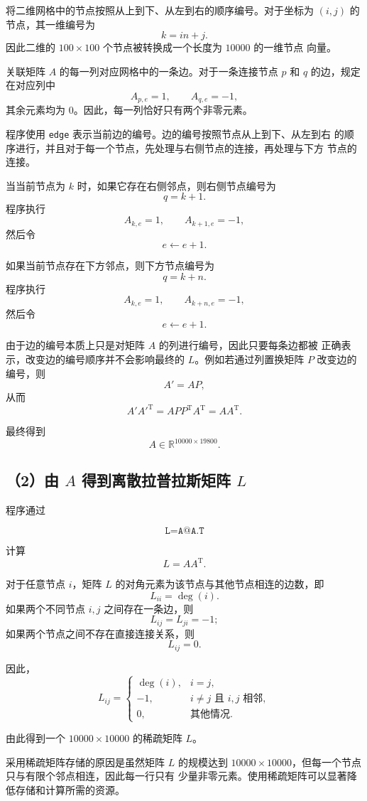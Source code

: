 \documentclass[UTF8,a4paper,11pt,fontset=fandol]{ctexart}
\begin{document}
将二维网格中的节点按照从上到下、从左到右的顺序编号。对于坐标为
$(i,j)$ 的节点，其一维编号为
\[
\boxed{k=in+j}.
\]
因此二维的 $100\times100$ 个节点被转换成一个长度为 $10000$ 的一维节点
向量。

关联矩阵 $A$ 的每一列对应网格中的一条边。对于一条连接节点 $p$ 和 $q$
的边，规定在对应列中
\[
A_{p,e}=1,\qquad A_{q,e}=-1,
\]
其余元素均为 $0$。因此，每一列恰好只有两个非零元素。

程序使用
\texttt{edge} 表示当前边的编号。边的编号按照节点从上到下、从左到右
的顺序进行，并且对于每一个节点，先处理与右侧节点的连接，再处理与下方
节点的连接。

当当前节点为 $k$ 时，如果它存在右侧邻点，则右侧节点编号为
\[
q=k+1.
\]
程序执行
\[
A_{k,e}=1,\qquad A_{k+1,e}=-1,
\]
然后令
\[
e\leftarrow e+1.
\]

如果当前节点存在下方邻点，则下方节点编号为
\[
q=k+n.
\]
程序执行
\[
A_{k,e}=1,\qquad A_{k+n,e}=-1,
\]
然后令
\[
e\leftarrow e+1.
\]

由于边的编号本质上只是对矩阵 $A$ 的列进行编号，因此只要每条边都被
正确表示，改变边的编号顺序并不会影响最终的 $L$。例如若通过列置换矩阵
$P$ 改变边的编号，则
\[
A'=AP,
\]
从而
\[
A'A'^{\mathrm T}
=APP^{\mathrm T}A^{\mathrm T}
=AA^{\mathrm T}.
\]

最终得到
\[
A\in\mathbb{R}^{10000\times19800}.
\]


\subsection*{（2）由 $A$ 得到离散拉普拉斯矩阵 $L$}

程序通过

\[
\texttt{L=A@A.T}
\]

计算
\[
\boxed{L=AA^{\mathrm T}}.
\]

对于任意节点 $i$，矩阵 $L$ 的对角元素为该节点与其他节点相连的边数，即
\[
L_{ii}=\deg(i).
\]
如果两个不同节点 $i,j$ 之间存在一条边，则
\[
L_{ij}=L_{ji}=-1;
\]
如果两个节点之间不存在直接连接关系，则
\[
L_{ij}=0.
\]

因此，
\[
L_{ij}=
\begin{cases}
\deg(i),&i=j,\\
-1,&i\ne j\text{ 且 }i,j\text{ 相邻},\\
0,&\text{其他情况}.
\end{cases}
\]

由此得到一个 $10000\times10000$ 的稀疏矩阵 $L$。

采用稀疏矩阵存储的原因是虽然矩阵 $L$ 的规模达到
$10000\times10000$，但每一个节点只与有限个邻点相连，因此每一行只有
少量非零元素。使用稀疏矩阵可以显著降低存储和计算所需的资源。
\end{document}
